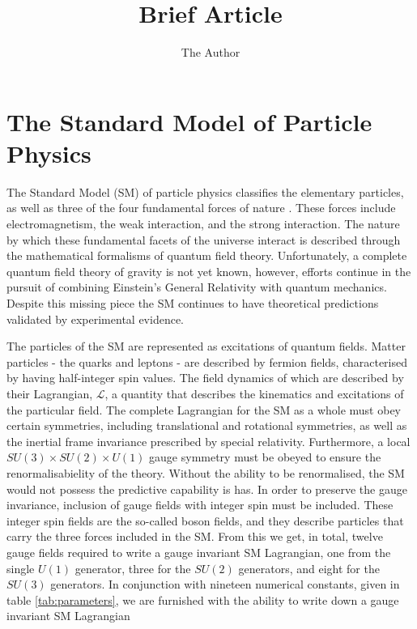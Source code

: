 \documentclass[12pt, oneside]{article}   	%
\title{Brief Article}
\author{The Author}
\begin{document}
\section{The Standard Model of Particle Physics}
The Standard Model (SM) of particle physics classifies the elementary particles, as well as three of the four fundamental forces of nature \cite{oerter2006theory}. 
These forces include electromagnetism, the weak interaction, and the strong interaction.
The nature by which these fundamental facets of the universe interact is described through the mathematical formalisms of quantum field theory.
Unfortunately, a complete quantum field theory of gravity is not yet known, however, efforts continue in the pursuit of combining Einstein's General Relativity with quantum mechanics.
Despite this missing piece the SM continues to have theoretical predictions validated by experimental evidence.

The particles of the SM are represented as excitations of quantum fields.
Matter particles - the quarks and leptons - are described by fermion fields, characterised by having half-integer spin values.
The field dynamics of which are described by their Lagrangian, $\mathcal{L}$, a quantity that describes the kinematics and excitations of the particular field. 
The complete Lagrangian for the SM as a whole must obey certain symmetries, including translational and rotational symmetries, as well as the inertial frame invariance prescribed by special relativity.
Furthermore, a local $SU(3) \times SU(2) \times U(1)$ gauge symmetry must be obeyed to ensure the renormalisabielity of the theory. 
Without the ability to be renormalised, the SM would not possess the predictive capability is has.
In order to preserve the gauge invariance, inclusion of gauge fields with integer spin must be included.
These integer spin fields are the so-called boson fields, and they describe particles that carry the three forces included in the SM.
From this we get, in total, twelve gauge fields required to write a gauge invariant SM Lagrangian, one from the single $U(1)$ generator, three for the $SU(2)$ generators, and eight for the $SU(3)$ generators.
In conjunction with nineteen numerical constants, given in table \ref{tab:parameters}, we are furnished with the ability to write down a gauge invariant SM Lagrangian
\end{document}
